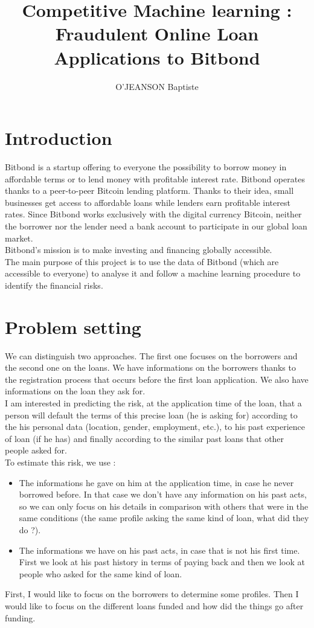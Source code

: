 \documentclass[a4paper,12pt]{article}
\title{Competitive Machine learning : Fraudulent Online Loan Applications to Bitbond}
\author{O'JEANSON Baptiste}
\begin{document}
	\maketitle
	\newpage

	\section{Introduction}
		Bitbond is a startup offering to everyone the possibility to borrow money in affordable terms or to lend money with profitable interest rate. Bitbond operates thanks to a peer-to-peer Bitcoin lending platform. Thanks to their idea, small businesses get access to affordable loans while lenders earn profitable interest rates. Since Bitbond works exclusively with the digital currency Bitcoin, neither the borrower nor the lender need a bank account to participate in our global loan market.\\
		Bitbond's mission is to make investing and financing globally accessible.\\

		The main purpose of this project is to use the data of Bitbond (which are accessible to everyone) to analyse it and follow a machine learning procedure to identify the financial risks.

	\section{Problem setting}
		We can distinguish two approaches. The first one focuses on the borrowers and the second one on the loans. We have informations on the borrowers thanks to the registration process that occurs before the first loan application. We also have informations on the loan they ask for.\\

		I am interested in predicting the risk, at the application time of the loan, that a person will default the terms of this precise loan (he is asking for) according to the his personal data (location, gender, employment, etc.), to his past experience of loan (if he has) and finally according to the similar past loans that other people asked for.\\

		To estimate this risk, we use :
		\begin{itemize}
			\item The informations he gave on him at the application time, in case he never borrowed before. In that case we don't have any information on his past acts, so we can only focus on his details in comparison with others that were in the same conditions (the same profile asking the same kind of loan, what did they do ?).
			\item The informations we have on his past acts, in case that is not his first time. First we look at his past history in terms of paying back and then we look at people who asked for the same kind of loan.
		\end{itemize}
		First, I would like to focus on the borrowers to determine some profiles. Then I would like to focus on the different loans funded and how did the things go after funding.
\end{document}
